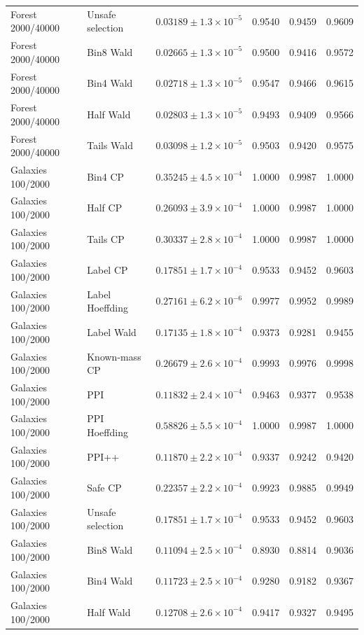 \begin{longtable}{llrrrr}
Forest 2000/40000 & Unsafe selection & $0.03189\pm 1.3\times 10^{-5}$ & 0.9540 & 0.9459 & 0.9609 \\
Forest 2000/40000 & Bin8 Wald & $0.02665\pm 1.3\times 10^{-5}$ & 0.9500 & 0.9416 & 0.9572 \\
Forest 2000/40000 & Bin4 Wald & $0.02718\pm 1.3\times 10^{-5}$ & 0.9547 & 0.9466 & 0.9615 \\
Forest 2000/40000 & Half Wald & $0.02803\pm 1.3\times 10^{-5}$ & 0.9493 & 0.9409 & 0.9566 \\
Forest 2000/40000 & Tails Wald & $0.03098\pm 1.2\times 10^{-5}$ & 0.9503 & 0.9420 & 0.9575 \\
Galaxies 100/2000 & Bin4 CP & $0.35245\pm 4.5\times 10^{-4}$ & 1.0000 & 0.9987 & 1.0000 \\
Galaxies 100/2000 & Half CP & $0.26093\pm 3.9\times 10^{-4}$ & 1.0000 & 0.9987 & 1.0000 \\
Galaxies 100/2000 & Tails CP & $0.30337\pm 2.8\times 10^{-4}$ & 1.0000 & 0.9987 & 1.0000 \\
Galaxies 100/2000 & Label CP & $0.17851\pm 1.7\times 10^{-4}$ & 0.9533 & 0.9452 & 0.9603 \\
Galaxies 100/2000 & Label Hoeffding & $0.27161\pm 6.2\times 10^{-6}$ & 0.9977 & 0.9952 & 0.9989 \\
Galaxies 100/2000 & Label Wald & $0.17135\pm 1.8\times 10^{-4}$ & 0.9373 & 0.9281 & 0.9455 \\
Galaxies 100/2000 & Known-mass CP & $0.26679\pm 2.6\times 10^{-4}$ & 0.9993 & 0.9976 & 0.9998 \\
Galaxies 100/2000 & PPI & $0.11832\pm 2.4\times 10^{-4}$ & 0.9463 & 0.9377 & 0.9538 \\
Galaxies 100/2000 & PPI Hoeffding & $0.58826\pm 5.5\times 10^{-4}$ & 1.0000 & 0.9987 & 1.0000 \\
Galaxies 100/2000 & PPI++ & $0.11870\pm 2.2\times 10^{-4}$ & 0.9337 & 0.9242 & 0.9420 \\
Galaxies 100/2000 & Safe CP & $0.22357\pm 2.2\times 10^{-4}$ & 0.9923 & 0.9885 & 0.9949 \\
Galaxies 100/2000 & Unsafe selection & $0.17851\pm 1.7\times 10^{-4}$ & 0.9533 & 0.9452 & 0.9603 \\
Galaxies 100/2000 & Bin8 Wald & $0.11094\pm 2.5\times 10^{-4}$ & 0.8930 & 0.8814 & 0.9036 \\
Galaxies 100/2000 & Bin4 Wald & $0.11723\pm 2.5\times 10^{-4}$ & 0.9280 & 0.9182 & 0.9367 \\
Galaxies 100/2000 & Half Wald & $0.12708\pm 2.6\times 10^{-4}$ & 0.9417 & 0.9327 & 0.9495 \\

\end{longtable}
